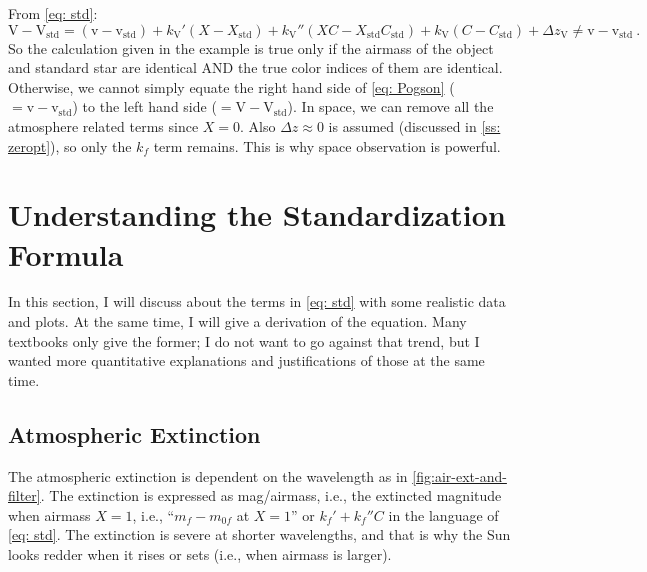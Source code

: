 From \cref{eq: std}:
\begin{equation}
  \mathrm{V} - \mathrm{V}_\mathrm{std}
    = (\mathrm{v} - \mathrm{v}_\mathrm{std})
    + k_\mathrm{V}'(X - X_\mathrm{std})
    + k_\mathrm{V}''(X C - X_\mathrm{std} C_\mathrm{std})
    + k_\mathrm{V}(C - C_\mathrm{std})
    + \Delta z_\mathrm{V}
    \neq \mathrm{v} - \mathrm{v}_\mathrm{std} ~.
\end{equation}
So the calculation given in the example is true only if the airmass of the object and standard star are identical AND the true color indices of them are identical. Otherwise, we cannot simply equate the right hand side of \cref{eq: Pogson} ($ = \mathrm{v} - \mathrm{v}_\mathrm{std} $) to the left hand side ($ = \mathrm{V} - \mathrm{V}_\mathrm{std} $). In space, we can remove all the atmosphere related terms since $ X = 0 $. Also $ \Delta z \approx 0 $ is assumed (discussed in \cref{ss: zeropt}), so only the $ k_f $ term remains. This is why space observation is powerful.

\section{Understanding the Standardization Formula}
In this section, I will discuss about the terms in \cref{eq: std} with some realistic data and plots. At the same time, I will give a derivation of the equation. Many textbooks only give the former; I do not want to go against that trend, but I wanted more quantitative explanations and justifications of those at the same time. 

\subsection{Atmospheric Extinction}
The atmospheric extinction is dependent on the wavelength as in \cref{fig:air-ext-and-filter}. The extinction is expressed as mag/airmass, i.e., the extincted magnitude when airmass $ X = 1 $, i.e., ``$ m_f - m_{0f} $ at $ X = 1 $'' or $ k_f' + k_f''C $ in the language of \cref{eq: std}. The extinction is severe at shorter wavelengths, and that is why the Sun looks redder when it rises or sets (i.e., when airmass is larger). 

